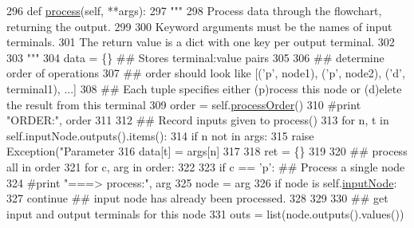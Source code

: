 \begin{DoxyCode}
296     \textcolor{keyword}{def }\hyperlink{classFlowchart_1_1Flowchart_a500d5ffa2b35e2dc7957a1f6fc8b0f03}{process}(self, **args):
297         \textcolor{stringliteral}{"""}
298 \textcolor{stringliteral}{        Process data through the flowchart, returning the output.}
299 \textcolor{stringliteral}{        }
300 \textcolor{stringliteral}{        Keyword arguments must be the names of input terminals. }
301 \textcolor{stringliteral}{        The return value is a dict with one key per output terminal.}
302 \textcolor{stringliteral}{        }
303 \textcolor{stringliteral}{        """}
304         data = \{\}  \textcolor{comment}{## Stores terminal:value pairs}
305         
306         \textcolor{comment}{## determine order of operations}
307         \textcolor{comment}{## order should look like [('p', node1), ('p', node2), ('d', terminal1), ...] }
308         \textcolor{comment}{## Each tuple specifies either (p)rocess this node or (d)elete the result from this terminal}
309         order = self.\hyperlink{classFlowchart_1_1Flowchart_a93e115629a83742fb6e56a097b9933aa}{processOrder}()
310         \textcolor{comment}{#print "ORDER:", order}
311         
312         \textcolor{comment}{## Record inputs given to process()}
313         \textcolor{keywordflow}{for} n, t \textcolor{keywordflow}{in} self.inputNode.outputs().items():
314             \textcolor{keywordflow}{if} n \textcolor{keywordflow}{not} \textcolor{keywordflow}{in} args:
315                 \textcolor{keywordflow}{raise} Exception(\textcolor{stringliteral}{"Parameter %
316             data[t] = args[n]
317         
318         ret = \{\}
319             
320         \textcolor{comment}{## process all in order}
321         \textcolor{keywordflow}{for} c, arg \textcolor{keywordflow}{in} order:
322             
323             \textcolor{keywordflow}{if} c == \textcolor{stringliteral}{'p'}:     \textcolor{comment}{## Process a single node}
324                 \textcolor{comment}{#print "===> process:", arg}
325                 node = arg
326                 \textcolor{keywordflow}{if} node \textcolor{keywordflow}{is} self.\hyperlink{classFlowchart_1_1Flowchart_a84ef6d80eda5bb411ed8fc42d498abf8}{inputNode}:
327                     \textcolor{keywordflow}{continue}  \textcolor{comment}{## input node has already been processed.}
328                 
329                             
330                 \textcolor{comment}{## get input and output terminals for this node}
331                 outs = list(node.outputs().values())
}
\end{DoxyCode}
